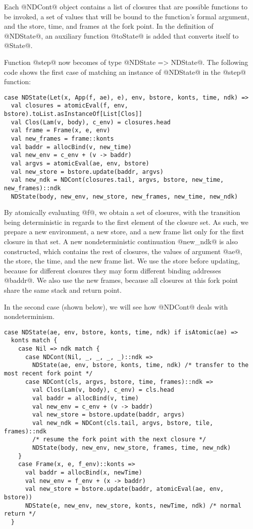 \documentclass[acmsmall]{acmart}\settopmatter{}
\begin{document}
Each @NDCont@ object contains a list of closures that are possible functions to be invoked,
a set of values that will be bound to the function's formal argument,
and the store, time, and frames at the fork point.
In the definition of @NDState@, an auxiliary function @toState@ is added that
converts itself to @State@.

Function @step@ now becomes of type @NDState => NDState@.
The following code shows the first case of matching an instance of @NDState@ in
the @step@ function:

\begin{lstlisting}
case NDState(Let(x, App(f, ae), e), env, bstore, konts, time, ndk) =>
  val closures = atomicEval(f, env, bstore).toList.asInstanceOf[List[Clos]]
  val Clos(Lam(v, body), c_env) = closures.head
  val frame = Frame(x, e, env)
  val new_frames = frame::konts
  val baddr = allocBind(v, new_time)
  val new_env = c_env + (v -> baddr)
  val argvs = atomicEval(ae, env, bstore)
  val new_store = bstore.update(baddr, argvs)
  val new_ndk = NDCont(closures.tail, argvs, bstore, new_time, new_frames)::ndk
  NDState(body, new_env, new_store, new_frames, new_time, new_ndk)
\end{lstlisting}

By atomically evaluating @f@, we obtain a set of closures, with the transition being deterministic in regards to the first element of the closure set.
As such, we prepare a new environment, a new store, and a new frame list only for the
first closure in that set.
A new nondeterministic continuation @new_ndk@ is also constructed,
which contains the rest of closures, the values of argument @ae@, the store,
the time, and the new frame list.
We use the store before updating, because for different closures they may form
different binding addresses @baddr@.
We also use the new frames, because all closures at this fork point share
the same stack and return point.

In the second case (shown below), we will see how @NDCont@ deals with
nondeterminism.

\begin{lstlisting}
case NDState(ae, env, bstore, konts, time, ndk) if isAtomic(ae) =>
  konts match {
    case Nil => ndk match {
      case NDCont(Nil, _, _, _, _)::ndk =>
        NDState(ae, env, bstore, konts, time, ndk) /* transfer to the most recent fork point */
      case NDCont(cls, argvs, bstore, time, frames)::ndk =>
        val Clos(Lam(v, body), c_env) = cls.head
        val baddr = allocBind(v, time)
        val new_env = c_env + (v -> baddr)
        val new_store = bstore.update(baddr, argvs)
        val new_ndk = NDCont(cls.tail, argvs, bstore, tile, frames)::ndk
        /* resume the fork point with the next closure */
        NDState(body, new_env, new_store, frames, time, new_ndk)
    }
    case Frame(x, e, f_env)::konts =>
      val baddr = allocBind(x, newTime)
      val new_env = f_env + (x -> baddr)
      val new_store = bstore.update(baddr, atomicEval(ae, env, bstore))
      NDState(e, new_env, new_store, konts, newTime, ndk) /* normal return */
  }
\end{lstlisting}
\end{document}
